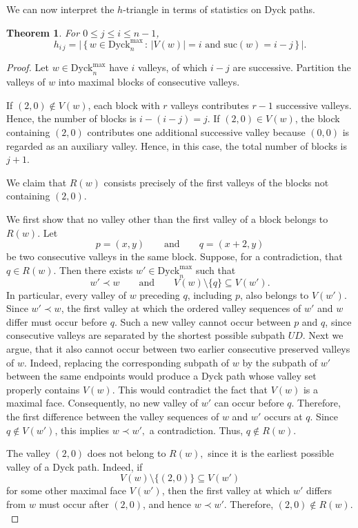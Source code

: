 \documentclass[11pt]{amsart}
\def\Dyck{\mathrm{Dyck}}
\def\suc{\mathrm{suc}}
\theoremstyle{plain}
\numberwithin{lemma}{\DefaultNumberTheoremWithin}
\newtheorem{theorem}{Theorem}
\numberwithin{theorem}{\DefaultNumberTheoremWithin}
\numberwithin{corollary}{\DefaultNumberTheoremWithin}
\numberwithin{proposition}{\DefaultNumberTheoremWithin}
\numberwithin{conjecture}{\DefaultNumberTheoremWithin}
\theoremstyle{definition}
\numberwithin{definition}{\DefaultNumberTheoremWithin}
\numberwithin{question}{\DefaultNumberTheoremWithin}
\numberwithin{problem}{\DefaultNumberTheoremWithin}
\theoremstyle{remark}
\numberwithin{remark}{\DefaultNumberTheoremWithin}
\numberwithin{example}{\DefaultNumberTheoremWithin}
\numberwithin{claim}{\DefaultNumberTheoremWithin}
\begin{document}
We can now interpret the $h$-triangle in terms of statistics on
Dyck paths.


\begin{theorem}\label{thm:typeA-h}
For $0\leq j\leq i\leq n-1$,
\[
h_{i\,j} = \Big|\,\big\{\,w \in \Dyck_{n}^{\max}\,:\, |V(w)| = i \text{ and } \suc(w) = i - j\,\big\}\,\Big|.\]
\end{theorem}

\begin{proof}
Let $w\in\Dyck_n^{\max}$ have $i$ valleys, of which $i-j$ are
successive. Partition the valleys of $w$ into maximal blocks of
consecutive valleys.

If $(2,0)\notin V(w)$, each block with $r$ valleys contributes
$r-1$ successive valleys. Hence, the number of blocks is
$i-(i-j)=j.$
If $(2,0)\in V(w)$, the block containing $(2,0)$ contributes one
additional successive valley because $(0,0)$ is regarded as an
auxiliary valley. Hence, in this case, the total number of blocks
is $j+1$.

We claim that $R(w)$ consists precisely of the first valleys of the blocks not containing $(2,0)$.

We first show that no valley other than the first valley of a
block belongs to $R(w)$. Let
\[
p=(x,y)
\qquad\text{and}\qquad
q=(x+2,y)
\]
be two consecutive valleys in the same block. Suppose, for a
contradiction, that $q\in R(w)$. Then there exists
$w'\in\Dyck_n^{\max}$ such that
\[w'\prec w
\qquad\text{and}\qquad
V(w)\setminus\{q\}\subseteq V(w').
\]
In particular, every valley of $w$ preceding $q$, including $p$,
also belongs to $V(w')$.
Since $w'\prec w$, the first valley at which the ordered valley sequences of $w'$ and $w$ differ must occur before $q$. Such a new valley cannot occur between $p$ and $q$, since consecutive valleys are separated by the shortest possible subpath $UD$. 
Next we argue, that it also cannot occur between two earlier consecutive
preserved valleys of $w$. Indeed, replacing the corresponding
subpath of $w$ by the subpath of $w'$ between the same endpoints
would produce a Dyck path whose valley set properly contains
$V(w)$. This would contradict the fact that $V(w)$ is a maximal face.
Consequently, no new valley of $w'$ can occur before $q$.
Therefore, the first difference between the valley sequences of
$w$ and $w'$ occurs at $q$. Since $q\notin V(w')$, this implies
$w\prec w',$ a contradiction. Thus, $q\notin R(w).$

The valley $(2,0)$ does not belong to $R(w),$ since it is the
earliest possible valley of a Dyck path. Indeed, if
\[
V(w)\setminus\{(2,0)\}\subseteq V(w')
\]
for some other maximal face $V(w')$, then the first valley at which
$w'$ differs from $w$ must occur after $(2,0)$, and hence
$w\prec w'$. Therefore, $(2,0)\notin R(w).$


\end{proof}
\end{document}
